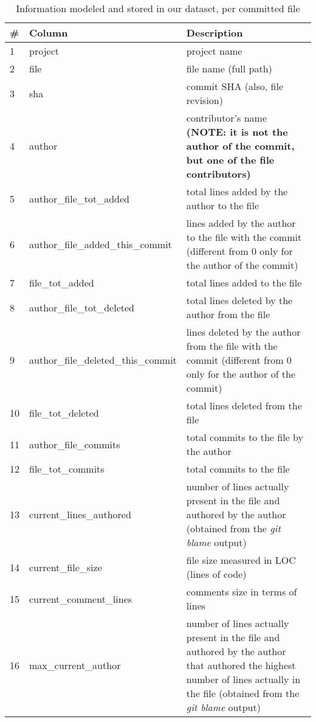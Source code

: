 \begin{table*}[ht]
\centering
\caption{Information modeled and stored in our dataset, per committed file}
\label{tab:modeled_information}
\begin{tabular}{|l|l|p{}|}
\hline
\# & \textbf{Column} & \textbf{Description}  \\\hline
\hline
1 & project & 
    project name \\ \hline
2 & file & 
    file name (full path)\\ \hline
3 & sha & 
    commit SHA (also, file revision) \\ \hline
4 & author & 
    contributor's name \textbf{(NOTE: it is not the author of the commit, but one of the file contributors)} \\ \hline
5 & author\_file\_tot\_added & 
    total lines added by the author to the file\\ \hline
6 & author\_file\_added\_this\_commit & 
    lines added by the author to the file with the commit (different from 0 only for the author of the commit)\\ \hline
7 & file\_tot\_added & 
    total lines added to the file\\ \hline
8 & author\_file\_tot\_deleted & 
    total lines deleted by the author from the file\\ \hline
9 & author\_file\_deleted\_this\_commit & 
    lines deleted by the author from the file with the commit (different from 0 only for the author of the commit)\\ \hline
10 & file\_tot\_deleted & 
    total lines deleted from the file\\ \hline
11 & author\_file\_commits & 
    total commits to the file by the author\\ \hline
12 & file\_tot\_commits & 
    total commits to the file\\ \hline
13 & current\_lines\_authored & 
    number of lines actually present in the file and authored by the author (obtained from the \textit{git blame} output)\\\hline
14 & current\_file\_size & 
    file size measured in LOC (lines of code)\\\hline
15 & current\_comment\_lines & 
    comments size in terms of lines\\\hline
16 & max\_current\_author & 
    number of lines actually present in the file and authored by the author that authored the highest number of lines actually in the file (obtained from the \textit{git blame} output)\\\hline

\end{tabular}
\end{table*}

